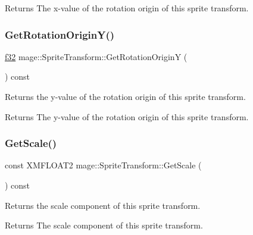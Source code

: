 \begin{DoxyReturn}{Returns}
The x-\/value of the rotation origin of this sprite transform. 
\end{DoxyReturn}
\hypertarget{structmage_1_1_sprite_transform_a991e4d01dd757907766f1d93fdaeae2a}{}\label{structmage_1_1_sprite_transform_a991e4d01dd757907766f1d93fdaeae2a} 
\subsubsection{\texorpdfstring{Get\+Rotation\+Origin\+Y()}{GetRotationOriginY()}}
{\footnotesize\ttfamily \hyperlink{namespacemage_a6a44ad388483959dc4dff9f2aef91431}{f32} mage\+::\+Sprite\+Transform\+::\+Get\+Rotation\+OriginY (\begin{DoxyParamCaption}{ }\end{DoxyParamCaption}) const\hspace{0.3cm}{\ttfamily [noexcept]}}

Returns the y-\/value of the rotation origin of this sprite transform.

\begin{DoxyReturn}{Returns}
The y-\/value of the rotation origin of this sprite transform. 
\end{DoxyReturn}
\hypertarget{structmage_1_1_sprite_transform_ac62a9a5b40abbbb40398885010990e55}{}\label{structmage_1_1_sprite_transform_ac62a9a5b40abbbb40398885010990e55} 
\subsubsection{\texorpdfstring{Get\+Scale()}{GetScale()}}
{\footnotesize\ttfamily const X\+M\+F\+L\+O\+A\+T2 mage\+::\+Sprite\+Transform\+::\+Get\+Scale (\begin{DoxyParamCaption}{ }\end{DoxyParamCaption}) const\hspace{0.3cm}{\ttfamily [noexcept]}}

Returns the scale component of this sprite transform.

\begin{DoxyReturn}{Returns}
The scale component of this sprite transform. 
\end{DoxyReturn}
\hypertarget{structmage_1_1_sprite_transform_aded0f45e62e48b27781181a714186482}{}\label{structmage_1_1_sprite_transform_aded0f45e62e48b27781181a714186482} 
